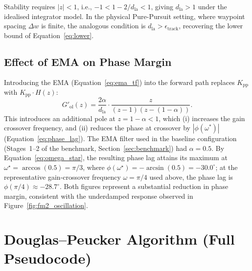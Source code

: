 \documentclass[12pt, a4paper, oneside]{report}
\theoremstyle{definition}
\newcommand{\dlookahead}{d_{\mathrm{la}}}
\begin{document}
Stability requires $|z| < 1$, i.e.,
$-1 < 1 - 2/\dlookahead < 1$, giving $\dlookahead > 1$ under the
idealised integrator model. In the physical Pure-Pursuit setting,
where waypoint spacing $\Delta w$ is finite, the analogous
condition is $\dlookahead > \epsilon_{\mathrm{track}}$, recovering
the lower bound of Equation~\eqref{eq:lower}.

\section*{Effect of EMA on Phase Margin}

Introducing the EMA (Equation~\eqref{eq:ema_tf}) into the forward
path replaces $K_{\mathrm{pp}}$ with $K_{\mathrm{pp}} \cdot H(z)$:
\begin{equation}
  G'_{\mathrm{ol}}(z) = \frac{2\alpha}{\dlookahead}
    \cdot \frac{z}{(z-1)(z-(1-\alpha))}.
\end{equation}
This introduces an additional pole at $z = 1-\alpha < 1$, which
(i) increases the gain crossover frequency, and (ii) reduces the
phase at crossover by $|\phi(\omega^*)|$
(Equation~\eqref{eq:phase_lag}). The EMA filter used in the
baseline configuration (Stages~1--2 of the benchmark,
Section~\ref{sec:benchmark}) had $\alpha = 0.5$. By
Equation~\eqref{eq:omega_star}, the resulting phase lag attains its
maximum at $\omega^\star = \arccos(0.5) = \pi/3$, where
$\phi(\omega^\star) = -\arcsin(0.5) = -30.0^\circ$; at the
representative gain-crossover frequency $\omega = \pi/4$ used
above, the phase lag is $\phi(\pi/4) \approx -28.7^\circ$. Both
figures represent a substantial reduction in phase margin,
consistent with the underdamped response observed in
Figure~\ref{fig:fm2_oscillation}.

\chapter{Douglas--Peucker Algorithm (Full Pseudocode)}
\label{app:dp}
\end{document}
